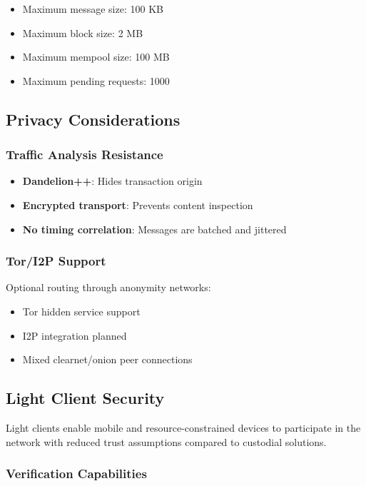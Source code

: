 \begin{itemize}
  \item Maximum message size: 100 KB
  \item Maximum block size: 2 MB
  \item Maximum mempool size: 100 MB
  \item Maximum pending requests: 1000
\end{itemize}

\subsection{Privacy Considerations}

\subsubsection{Traffic Analysis Resistance}

\begin{itemize}
  \item \textbf{Dandelion++}: Hides transaction origin
  \item \textbf{Encrypted transport}: Prevents content inspection
  \item \textbf{No timing correlation}: Messages are batched and jittered
\end{itemize}

\subsubsection{Tor/I2P Support}

Optional routing through anonymity networks:
\begin{itemize}
  \item Tor hidden service support
  \item I2P integration planned
  \item Mixed clearnet/onion peer connections
\end{itemize}

\subsection{Light Client Security}
\label{sec:light-clients}

Light clients enable mobile and resource-constrained devices to participate
in the network with reduced trust assumptions compared to custodial solutions.

\subsubsection{Verification Capabilities}

